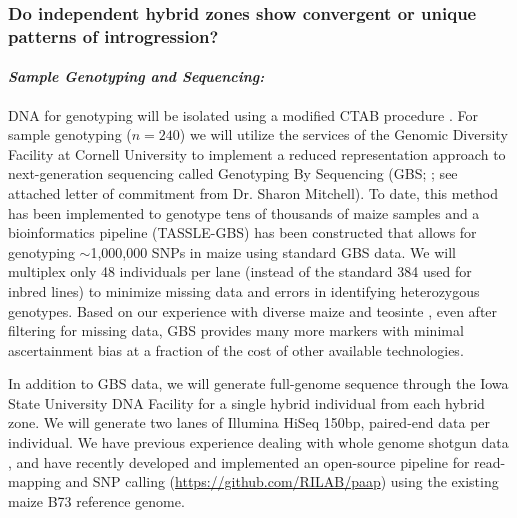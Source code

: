 \subsubsection{Do independent hybrid zones show convergent or unique patterns of introgression?}
\label{sss:genomescan}



\paragraph{\emph{Sample Genotyping and Sequencing:}}
DNA for genotyping will be isolated using a modified CTAB procedure \citep{Saghai-Maroof1984}.  For sample genotyping ($n=240$) we will utilize the services of the Genomic Diversity Facility at Cornell University to implement a reduced representation approach to next-generation sequencing called Genotyping By Sequencing (GBS; \citealt{Elshire2011}; see attached letter of commitment from Dr. Sharon Mitchell). To date, this method has been implemented to genotype tens of thousands of maize samples and a bioinformatics pipeline (TASSLE-GBS) has been constructed that allows for genotyping $\sim$1,000,000 SNPs in maize \citep{Glaubitz2014} using standard GBS data. 
We will multiplex only 48 individuals per lane (instead of the standard 384 used for inbred lines) to minimize missing data and errors in identifying heterozygous genotypes. 
Based on our experience with diverse maize and teosinte \citep[e.g.][]{Takuno15062015, mezmouk2014pattern}, even after filtering for missing data, GBS provides many more markers with minimal ascertainment bias at a fraction of the cost of other available technologies. 

In addition to GBS data, we will generate full-genome sequence through the Iowa State University DNA Facility for a single hybrid individual from each hybrid zone.  We will generate two lanes of Illumina HiSeq 150bp, paired-end data per individual.  
We have previous experience dealing with whole genome shotgun data \citep{Gore2009,Chia2012a,Hufford2012b,da2015origin}, and have recently developed and implemented an open-source pipeline for read-mapping and SNP calling (\url{https://github.com/RILAB/paap}) using the existing maize B73 reference genome. 

